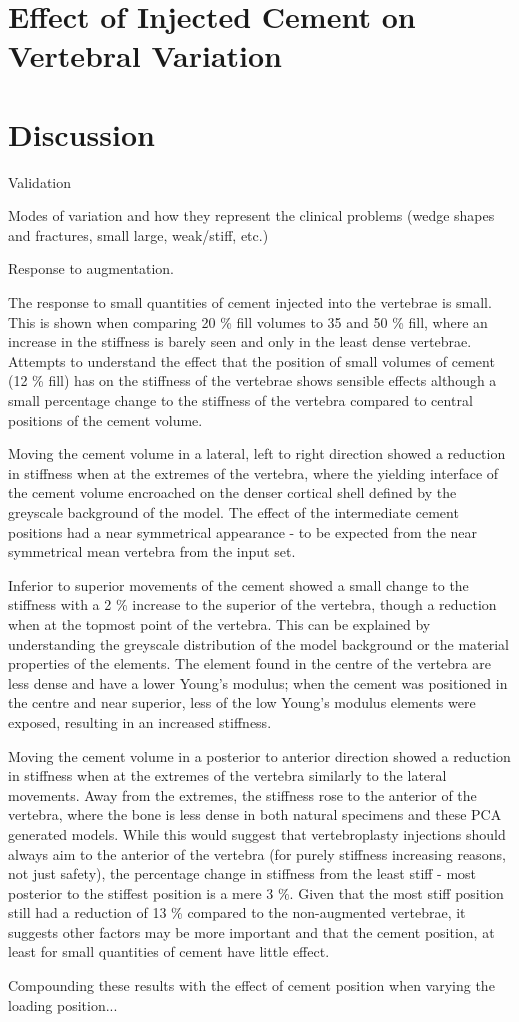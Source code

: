 \section{Effect of Injected Cement on Vertebral Variation}

\section{Discussion}

Validation

Modes of variation and how they represent the clinical problems (wedge shapes and fractures, small large, weak/stiff, etc.)

Response to augmentation.

The response to small quantities of cement injected into the vertebrae is small. This is shown when comparing 20 \% fill volumes to 35 and 50 \% fill, where an increase in the stiffness is barely seen and only in the least dense vertebrae.
Attempts to understand the effect that the position of small volumes of cement (12 \% fill) has on the stiffness of the vertebrae shows sensible effects although a small percentage change to the stiffness of the vertebra compared to central positions of the cement volume.



Moving the cement volume in a lateral, left to right direction showed a reduction in stiffness when at the extremes of the vertebra, where the yielding interface of the cement volume encroached on the denser cortical shell defined by the greyscale background of the model.
The effect of the intermediate cement positions had a near symmetrical appearance - to be expected from the near symmetrical mean vertebra from the input set.

Inferior to superior movements of the cement showed a small change to the stiffness with a 2 \% increase to the superior of the vertebra, though a reduction when at the topmost point of the vertebra.
This can be explained by understanding the greyscale distribution of the model background or the material properties of the elements.
The element found in the centre of the vertebra are less dense and have a lower Young's modulus; when the cement was positioned in the centre and near superior, less of the low Young's modulus elements were exposed, resulting in an increased stiffness.

Moving the cement volume in a posterior to anterior direction showed a reduction in stiffness when at the extremes of the vertebra similarly to the lateral movements.
Away from the extremes, the stiffness rose to the anterior of the vertebra, where the bone is less dense in both natural specimens and these PCA generated models.
While this would suggest that vertebroplasty injections should always aim to the anterior of the vertebra (for purely stiffness increasing reasons, not just safety), the percentage change in stiffness from the least stiff - most posterior to the stiffest position is a mere 3 \%.
Given that the most stiff position still had a reduction of 13 \% compared to the non-augmented vertebrae, it suggests other factors may be more important and that the cement position, at least for small quantities of cement have little effect.

Compounding these results with the effect of cement position when varying the loading position...


